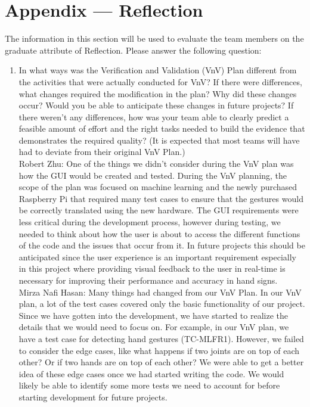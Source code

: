 \documentclass[12pt, titlepage]{article}
\begin{document}
\newpage{}
\section*{Appendix --- Reflection}

The information in this section will be used to evaluate the team members on the
graduate attribute of Reflection.  Please answer the following question:

\begin{enumerate}
  \item In what ways was the Verification and Validation (VnV) Plan different
  from the activities that were actually conducted for VnV?  If there were
  differences, what changes required the modification in the plan?  Why did
  these changes occur?  Would you be able to anticipate these changes in future
  projects?  If there weren't any differences, how was your team able to clearly
  predict a feasible amount of effort and the right tasks needed to build the
  evidence that demonstrates the required quality?  (It is expected that most
  teams will have had to deviate from their original VnV Plan.)\\

  Robert Zhu: One of the things we didn’t consider during the VnV plan was how the 
  GUI would be created and tested. During the VnV planning, the scope of the plan was 
  focused on machine learning and the newly purchased Raspberry Pi that required many 
  test cases to ensure that the gestures would be correctly translated using the new 
  hardware. The GUI requirements were less critical during the development process, 
  however during testing, we needed to think about how the user is about to access 
  the different functions of the code and the issues that occur from it. In future 
  projects this should be anticipated since the user experience is an important 
  requirement especially in this project where providing visual feedback to the user 
  in real-time is necessary for improving their performance and accuracy in hand signs.\\
  
  Mirza Nafi Hasan: Many things had changed from our VnV Plan. In our VnV plan, a lot 
  of the test cases covered only the basic functionality of our project. Since we have 
  gotten into the development, we have started to realize the details that we would need 
  to focus on. For example, in our VnV plan, we have a test case for detecting hand 
  gestures (TC-MLFR1). However, we failed to consider the edge cases, like what happens
  if two joints are on top of each other? Or if two hands are on top of each other? We 
  were able to get a better idea of these edge cases once we had started writing the 
  code. We would likely be able to identify some more tests we need to account for 
  before starting development for future projects.\\


\end{enumerate}
\end{document}
